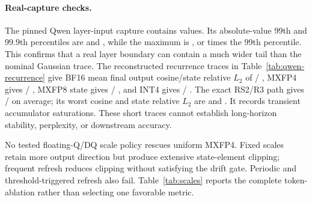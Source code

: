 \documentclass[conference]{IEEEtran}
\begin{document}
\paragraph{Real-capture checks.}
The pinned Qwen layer-input capture contains
\CorrectedQwenCaptureElements{} values. Its absolute-value 99th and 99.9th
percentiles are \CorrectedQwenCaptureAbsPnn{} and
\CorrectedQwenCaptureAbsPnnn{}, while the maximum is
\CorrectedQwenCaptureAbsMax{}, or \CorrectedQwenCaptureMaxToPnn{} times the
99th percentile. This confirms that a real layer boundary can contain a much
wider tail than the nominal Gaussian trace. The reconstructed recurrence traces
in Table~\ref{tab:qwen-recurrence} give BF16 mean final output cosine/state
relative $L_2$ of
\CorrectedQwenRecurrentBfSixteenMeanFinalCosine{}/
\CorrectedQwenRecurrentBfSixteenMeanStateRelLTwo{}, MXFP4 gives
\CorrectedQwenRecurrentMxfpFourMeanFinalCosine{}/
\CorrectedQwenRecurrentMxfpFourMeanStateRelLTwo{}, MXFP8 state gives
\CorrectedQwenRecurrentMxfpEightStateMeanFinalCosine{}/
\CorrectedQwenRecurrentMxfpEightStateMeanStateRelLTwo{}, and INT4 gives
\CorrectedQwenRecurrentIntFourMeanFinalCosine{}/
\CorrectedQwenRecurrentIntFourMeanStateRelLTwo{}. The exact RS2/R3 path gives
\CorrectedQwenRecurrentRsTwoMeanFinalCosine{}/
\CorrectedQwenRecurrentRsTwoMeanStateRelLTwo{} on average; its worst cosine
and state relative $L_2$ are \CorrectedQwenRecurrentRsTwoWorstCosine{} and
\CorrectedQwenRecurrentRsTwoWorstStateRelLTwo{}. It records
\CorrectedQwenRecurrentRsTwoAccumulatorSaturations{} transient accumulator
saturations. These short traces cannot establish long-horizon stability,
perplexity, or downstream accuracy.

\begin{table}[t]
\centering
\caption{Exact RS2/R3 and floating-Q/DQ recurrence diagnostics on four
model-derived Qwen layer-12 prompt traces. Final values are averaged per prompt;
``worst'' and maximum absolute error range over all prompts and valid token
positions.}
\label{tab:qwen-recurrence}
\scriptsize
\resizebox{\textwidth}{!}{}
\end{table}

No tested floating-Q/DQ scale policy rescues uniform MXFP4. Fixed scales retain
more output direction but produce extensive state-element clipping; frequent
refresh reduces clipping without satisfying the drift gate. Periodic and
threshold-triggered refresh also fail.
Table~\ref{tab:scales} reports the complete token-\CorrectedLongTraceTokens{}
ablation rather than
selecting one favorable
metric.
\end{document}
